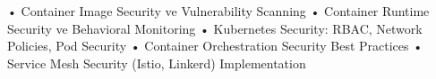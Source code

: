 • Container Image Security ve Vulnerability Scanning
• Container Runtime Security ve Behavioral Monitoring
• Kubernetes Security: RBAC, Network Policies, Pod Security
• Container Orchestration Security Best Practices
• Service Mesh Security (Istio, Linkerd) Implementation